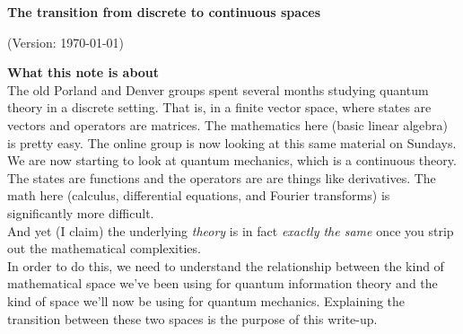 \documentclass{article}
\newcommand{\head}[1]{ \vspace{12pt} {\bf #1} \vspace{-12pt}\\ }
\def\p{ \vspace{10pt}\\ }
\begin{document}

\raggedbottom 
{}
\hfuzz=9999pt

\setlength{\parindent}{0pt}
\linespread{1.5} \selectfont
\begin{center}

\fontsize{18}{18}\selectfont
{\bf The transition from discrete to continuous spaces}


\fontsize{12}{12}\selectfont
(Version: \today)
\vspace{4pt}\\

\end{center}

\fontsize{12}{12}\selectfont

\head{What this note is about}

The old Porland and Denver groups spent several months studying quantum
theory in a discrete
setting. That is, in a finite vector space, where states are vectors and
operators are matrices. The mathematics here (basic linear algebra) is
pretty easy. The online group is now looking at this same material
on Sundays.
\p
We are now starting to look at quantum mechanics, which is a continuous
theory. The states are functions and the operators are are things like
derivatives. The math here (calculus, differential equations, and Fourier
transforms) is significantly more difficult.
\p
And yet (I claim) the underlying {\it theory} is in fact {\it exactly the
same} once you strip out the mathematical complexities.
\p
In order to do this, we need to understand the relationship between the
kind of mathematical space we've been using for quantum information theory
and the kind of space we'll now be using for quantum mechanics. Explaining
the transition between these two spaces is the purpose of this write-up.
\end{document}
